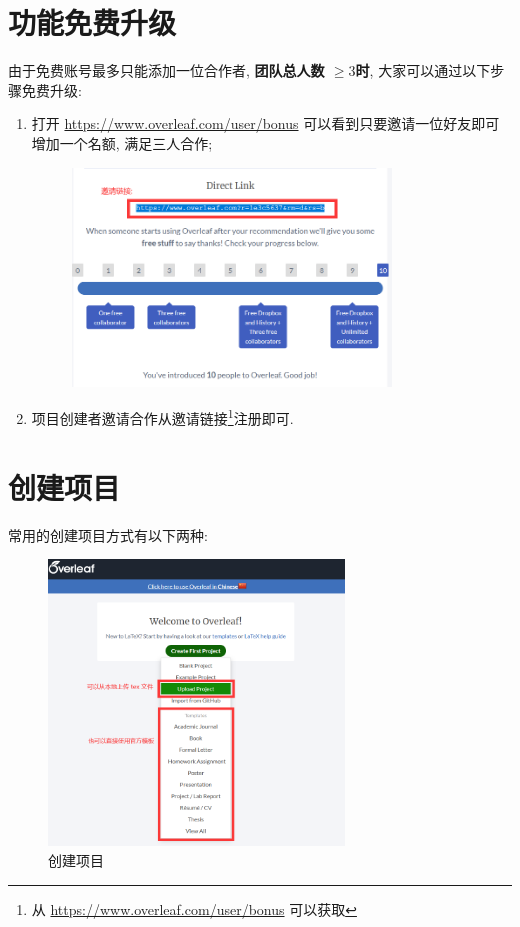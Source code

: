 \documentclass{formatBook}
\begin{document}
\section{功能免费升级}\label{header-n5}

由于免费账号最多只能添加一位合作者, \textbf{团队总人数 \( \geq3\)时},
大家可以通过以下步骤免费升级:

\begin{enumerate}
    \item 打开 \url{https://www.overleaf.com/user/bonus}
          可以看到只要邀请一位好友即可增加一个名额, 满足三人合作;
          \begin{figure}[H]
              \centering
              \includegraphics[width=0.8\textwidth]{Guidepics/20210415183943.png}
          \end{figure}
    \item 项目创建者邀请合作从邀请链接\footnote{从 \url{https://www.overleaf.com/user/bonus} 可以获取}注册即可.
\end{enumerate}

\section{创建项目}\label{header-n10}

常用的创建项目方式有以下两种:
\begin{figure}[H]
    \centering
    \includegraphics[width=0.7\textwidth]{Guidepics/20210415183951.png}
    \caption{创建项目}
\end{figure}
\end{document}
